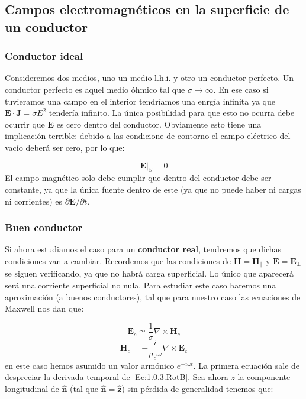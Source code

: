 \documentclass[12pt,a4paper]{article}
\newcommand{\rota}{\nabla \times}
\newcommand{\En}{\mathbf{E}}
\newcommand{\Hn}{\mathbf{H}}
\newcommand{\Jn}{\mathbf{J}}
\newcommand{\hnn}{\hat{\mathbf{n}}}
\newcommand{\hnz}{\hat{\mathbf{z}}}
\numberwithin{equation}{section}
\numberwithin{figure}{section}
\begin{document}
\subsection{Campos electromagnéticos en la superficie de un conductor}
 
\subsubsection{Conductor ideal}


Consideremos dos medios, uno un medio l.h.i. y otro un conductor perfecto. Un conductor perfecto es aquel medio óhmico tal que $\sigma \rightarrow \infty$. En ese caso si tuvieramos una campo en el interior tendríamos una enrgía infinita ya que $\En \cdot \Jn = \sigma E^2$ tendería infinito. La única posibilidad para que esto no ocurra debe ocurrir que $\En$ es cero dentro del conductor. Obviamente esto tiene una implicación terrible: debido a las condicione de contorno el campo eléctrico del vacío deberá ser cero, por lo que:

\begin{equation}
\En |_S = 0 
\end{equation}
El campo magnético solo debe cumplir que dentro del conductor debe ser constante, ya que la única fuente dentro de este (ya que no puede haber ni cargas ni corrientes) es $\partial \En / \partial t$. 

\subsubsection{Buen conductor}

 Si ahora estudiamos el caso para un \textbf{conductor real}, tendremos que dichas condiciones van a cambiar. Recordemos que las condiciones de $\Hn = \Hn_{\|}$ y $\En=\En_\bot$ se siguen verificando, ya que no habrá carga superficial. Lo único que aparecerá será una corriente superficial no nula. Para estudiar este caso haremos una aproximación (a buenos conductores), tal que para nuestro caso las ecuaciones de Maxwell nos dan que:
 
\begin{equation}
\En_c  \simeq \dfrac{1}{\sigma} \rota \Hn_c
\end{equation}
\begin{equation}
\Hn_c  = -   \dfrac{i}{\mu_c \omega} \rota \En_c
\end{equation}
en este caso hemos asumido un valor armónico $e^{-i \omega t}$. La primera ecuación sale de despreciar la derivada temporal de \ref{Ec:1.0.3.RotB}. Sea ahora $z$ la componente longitudinal de $\hnn$ (tal que $\hnn = \hnz$) sin pérdida de generalidad tenemos que:
\end{document}
